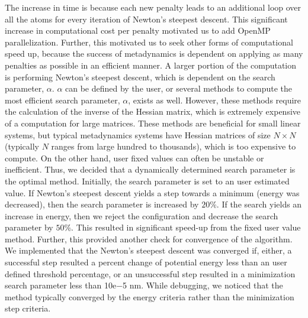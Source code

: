 The increase in time is because each new penalty leads to an additional loop over all the atoms for every iteration of Newton's steepest descent.  This significant increase in computational cost per penalty motivated us to add OpenMP parallelization.  Further, this motivated us to seek other forms of computational speed up, because the success of metadynamics is dependent on applying as many penalties as possible in an efficient manner.  A larger portion of the computation is performing Newton's steepest descent, which is dependent on the search parameter, $\alpha$.  $\alpha$ can be defined by the user, or several methods to compute the most efficient search parameter, $\alpha$, exists as well.  However, these methods require the calculation of the inverse of the Hessian matrix, which is extremely expensive of a computation for large matrices.  These methods are beneficial for small linear systems, but typical metadynamics systems have Hessian matrices of size $N\times N$ (typically $N$ ranges from large hundred to thousands), which is too expensive to compute. On the other hand, user fixed values can often be unstable or inefficient.  Thus, we decided that a dynamically determined search parameter is the optimal method.  Initially, the search parameter is set to an user estimated value. If Newton's steepest descent yields a step towards a minimum (energy was decreased), then the search parameter is increased by $20\%$.  If the search yields an increase in energy, then we reject the configuration and decrease the search parameter by $50\%$.  This resulted in significant speed-up from the fixed user value method.  Further, this provided another check for convergence of the algorithm.  We implemented that the Newton's steepest descent was converged if, either, a successful step resulted a percent change of potential energy less than an user defined threshold percentage, or an unsuccessful step resulted in a minimization search parameter less than 10e$-$5 nm.  While debugging, we noticed that the method typically converged by the energy criteria rather than the minimization step criteria.  

